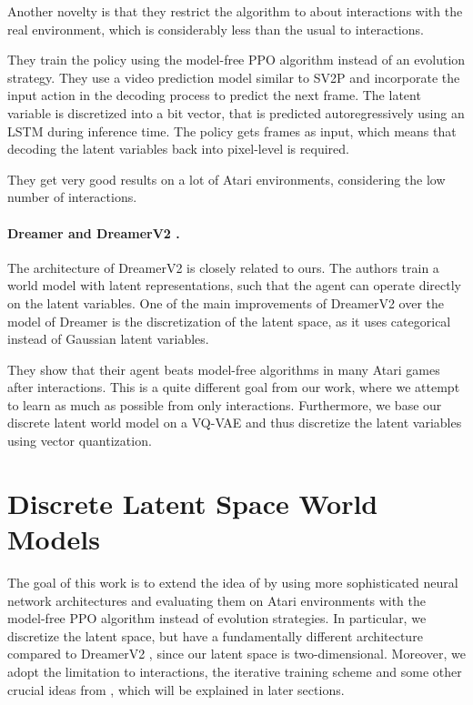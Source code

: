 \documentclass{article}
\begin{document}
Another novelty is that they restrict the algorithm to about 
interactions with the real environment, which is considerably less than the
usual  to  interactions.

They train the policy using the model-free PPO algorithm \citep{ppo} instead of
an evolution strategy. They use a video prediction model similar to SV2P
\citep{sv2p} and incorporate the input action in the decoding process to predict
the next frame. The latent variable is discretized into a bit vector, that is
predicted autoregressively using an LSTM during inference time. The policy gets
frames as input, which means that decoding the latent variables back into
pixel-level is required.

\newpage
They get very good results on a lot of Atari environments, considering the low
number of interactions.

\paragraph{Dreamer \citep{dreamer} and DreamerV2 \citep{dreamerv2}.}
The architecture of DreamerV2 is closely related to ours. The authors train a
world model with latent representations, such that the agent can operate
directly on the latent variables. One of the main improvements of DreamerV2 over
the model of Dreamer is the discretization of the latent space, as it uses
categorical instead of Gaussian latent variables.

They show that their agent beats model-free algorithms in many Atari games after
 interactions. This is a quite different goal from our work, where we
attempt to learn as much as possible from only  interactions. Furthermore,
we base our discrete latent world model on a VQ-VAE and thus discretize the
latent variables using vector quantization.

\section{Discrete Latent Space World Models}

The goal of this work is to extend the idea of \citet{world-models} by using
more sophisticated neural network architectures and evaluating them on Atari
environments with the model-free PPO algorithm instead of evolution strategies.
In particular, we discretize the latent space, but have a fundamentally
different architecture compared to DreamerV2 \citep{dreamerv2}, since our latent
space is two-dimensional. Moreover, we adopt the limitation to 
interactions, the iterative training scheme and some other crucial ideas from
\citet{simple}, which will be explained in later sections.
\end{document}
